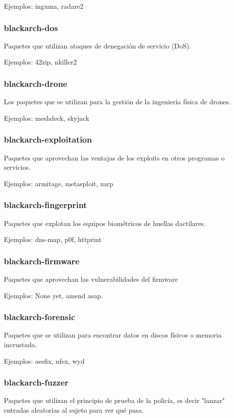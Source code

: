 \documentclass[a4paper, oneside, 11pt]{book}
\begin{document}
Ejemplos: inguma, radare2

\subsubsection{blackarch-dos}
Paquetes que utilizan ataques de denegaci\'on de servicio (DoS).

Ejemplos: 42zip, nkiller2

\subsubsection{blackarch-drone}
Los paquetes que se utilizan para la gesti\'on de la ingeniería f\'isica de drones.

Ejemplos: meshdeck, skyjack

\subsubsection{blackarch-exploitation}
Paquetes que aprovechan las ventajas de los exploits en otros programas o servicios.

Ejemplos: armitage, metasploit, zarp

\subsubsection{blackarch-fingerprint}
Paquetes que explotan los equipos biom\'etricos de huellas dactilares.

Ejemplos: dns-map, p0f, httprint

\subsubsection{blackarch-firmware}
Paquetes que aprovechan las vulnerabilidades del firmware

Ejemplos: None yet, amend asap.

\subsubsection{blackarch-forensic}
Paquetes que se utilizan para encontrar datos en discos físicos o memoria incrustada.

Ejemplos: aesfix, nfex, wyd

\subsubsection{blackarch-fuzzer}
Paquetes que utilizan el principio de prueba de la polic\'ia, es decir
"lanzar" entradas aleatorias al sujeto para ver qu\'e pasa.
\end{document}
